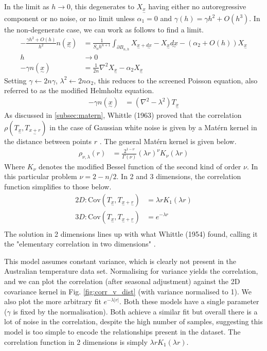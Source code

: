 \documentclass[12pt,a4paper]{article} %
\newcommand{\ve}[1]{\underset{\sim}{#1}}
\begin{document}
In the limit as $h\to0$, this degenerates to $X_{\ve{x}}$ having either no autoregressive component or no noise, or no limit unless $\alpha_1=0$ and $\gamma(h)=\gamma h^2 + O(h^3)$. In the non-degenerate case, we can work as follows to find a limit.
\begin{align*}
    -\frac{\gamma h^2 + O(h)}{h^2}n(\ve{x})&=\frac{1}{S_nh^{n+1}}\int_{\partial B_{n,h}}X_{\ve{x}+\ve{dx}}-X_{\ve{x}}\ve{dx}-(\alpha_2+O(h))X_{\ve{x}}\\
    h&\to0\\
    -\gamma n(\ve{x})&=\frac{1}{2n}\nabla^2X_{\ve{x}}-\alpha_2 X_{\ve{x}}
\end{align*}
Setting $\gamma\leftarrow 2n\gamma$, $\lambda^2\leftarrow 2n\alpha_2$, this reduces to the screened Poisson equation, also referred to as the modified Helmholtz equation.
\begin{align*}
    -\gamma n(\ve{x})&=(\nabla^2-\lambda^2)T_{\ve{x}}
\end{align*}
As discussed in \ref{subsec:matern}, Whittle (1963) proved that the correlation $\rho(T_{\ve{x}},T_{\ve{x+r}})$ in the case of Gaussian white noise is given by a Mat\'{e}rn kernel in the distance between points $r$ \cite{whittle}. The general Mat\'{e}rn kernel is given below.
\begin{align*}
    \rho_{\nu,\lambda}(r)&=\frac{2^{1-\nu}}{\Gamma(\nu)}(\lambda r)^\nu K_\nu(\lambda r)
\end{align*}
Where $K_\nu$ denotes the modified Bessel function of the second kind of order $\nu$. In this particular problem $\nu=2-n/2$. In 2 and 3 dimensions, the correlation function simplifies to those below.
\begin{align*}
    2D:\text{Cov}(T_{\ve{x}},T_{\ve{x}+\ve{r}})&=\lambda rK_1(\lambda r)\\
    3D:\text{Cov}(T_{\ve{x}},T_{\ve{x}+\ve{r}})&=e^{-\lambda r}\\
\end{align*}
The solution in 2 dimensions lines up with what Whittle (1954) found, calling it the "elementary correlation in two dimensions" \cite{whittle2}. 


This model assumes constant variance, which is clearly not present in the Australian temperature data set. Normalising for variance yields the correlation, and we can plot the correlation (after seasonal adjustment) against the 2D covariance kernel in Fig. \ref{fig:corr_v_dist} (with variance normalised to 1). We also plot the more arbitrary fit $e^{-\lambda|r|}$. Both these models have a single parameter ($\gamma$ is fixed by the normalisation). Both achieve a similar fit but overall there is a lot of noise in the correlation, despite the high number of samples, suggesting this model is too simple to encode the relationships present in the dataset. The correlation function in 2 dimensions is simply $\lambda rK_1(\lambda r)$.
\end{document}
